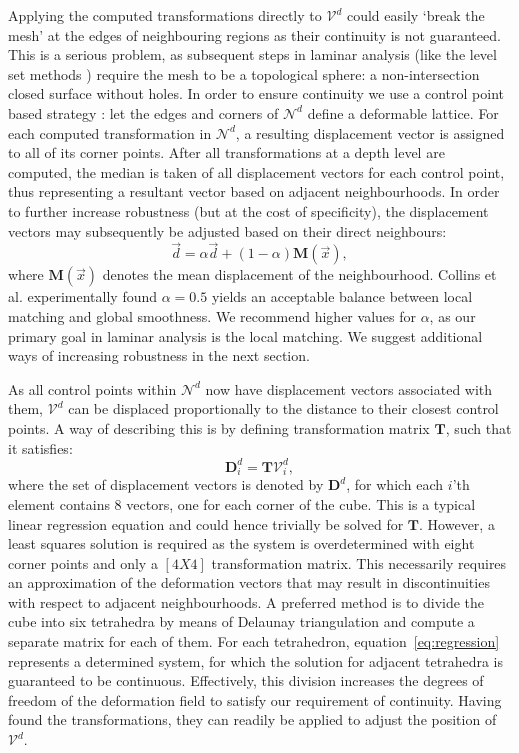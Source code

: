 Applying the computed transformations directly to $\mathcal{V}^{d}$ could easily `break the mesh' at the edges of neighbouring regions as their continuity is not guaranteed. This is a serious problem, as subsequent steps in laminar analysis (like the level set methods \cite{Sethian1999}) require the mesh to be a topological sphere: a non-intersection closed surface without holes. In order to ensure continuity we use a control point based strategy \cite{Collins1995}: let the edges and corners of $\mathcal{N}^{d}$ define a deformable lattice. For each computed transformation in $\mathcal{N}^{d}$, a resulting displacement vector is assigned to all of its corner points. After all transformations at a depth level are computed, the median is taken of all displacement vectors for each control point, thus representing a resultant vector based on adjacent neighbourhoods. In order to further increase robustness (but at the cost of specificity), the displacement vectors may subsequently be adjusted based on their direct neighbours:
\begin{equation}
\vec{d}=\alpha \vec{d} + \left(1-\alpha\right) \mathbf{M}(\vec{x}),
\label{eq:alphasmoothing}
\end{equation}
where $\mathbf{M}(\vec{x})$ denotes the mean displacement of the neighbourhood. Collins et al. \cite{Collins1995} experimentally found $\alpha=0.5$ yields an acceptable balance between local matching and global smoothness. We recommend higher values for $\alpha$, as our primary goal in laminar analysis is the local matching. We suggest additional ways of increasing robustness in the next section.

As all control points within $\mathcal{N}^{d}$ now have displacement vectors associated with them, $\mathcal{V}^{d}$ can be displaced proportionally to the distance to their closest control points. A way of describing this is by defining transformation matrix $\mathbf{T}$, such that it satisfies:
\begin{equation}
\mathbf{D}_{i}^{d}=\mathbf{T}\mathcal{V}_{i}^{d},
\label{eq:regression}
\end{equation}
where the set of displacement vectors is denoted by $\mathbf{D}^{d}$, for which each $i$'th element contains 8 vectors, one for each corner of the cube. This is a typical linear regression equation and could hence trivially be solved for $\mathbf{T}$. However, a least squares solution is required as the system is overdetermined with eight corner points and only a $[4 X 4]$ transformation matrix. This necessarily requires an approximation of the deformation vectors that may result in discontinuities with respect to adjacent neighbourhoods. A preferred method is to divide the cube into six tetrahedra by means of Delaunay triangulation \cite{Delaunay1934} and compute a separate matrix for each of them. For each tetrahedron, equation~\ref{eq:regression} represents a determined system, for which the solution for adjacent tetrahedra is guaranteed to be continuous. Effectively, this division increases the degrees of freedom of the deformation field to satisfy our requirement of continuity. Having found the transformations, they can readily be applied to adjust the position of $\mathcal{V}^{d}$.

